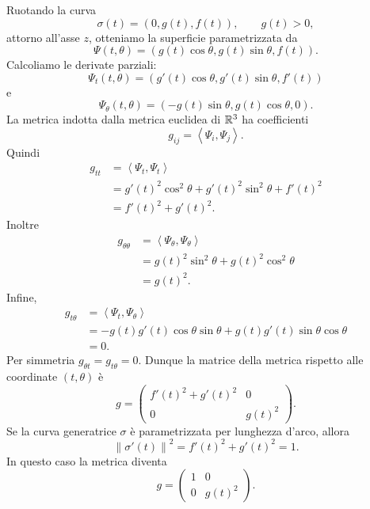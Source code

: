 \documentclass[a4paper]{article}
\begin{document}
\begin{snippetsolution}{}
    Ruotando la curva
    \[
        \sigma(t)=\left(0,g(t),f(t)\right),
        \qquad g(t)>0,
    \]
    attorno all'asse \(z\), otteniamo la superficie parametrizzata da
    \[
        \Psi(t,\theta)
        =
        \left(
            g(t)\cos\theta,
            g(t)\sin\theta,
            f(t)
        \right).
    \]
    Calcoliamo le derivate parziali:
    \[
        \Psi_t(t,\theta)
        =
        \left(
            g'(t)\cos\theta,
            g'(t)\sin\theta,
            f'(t)
        \right)
    \]
    e
    \[
        \Psi_\theta(t,\theta)
        =
        \left(
            -g(t)\sin\theta,
            g(t)\cos\theta,
            0
        \right).
    \]
    La metrica indotta dalla metrica euclidea di \(\mathbb{R}^3\) ha coefficienti
    \[
        g_{ij}=\left\langle \Psi_i,\Psi_j\right\rangle.
    \]
    Quindi
    \begin{align*}
        g_{tt}
        &=
        \left\langle \Psi_t,\Psi_t\right\rangle\\
        &=
        g'(t)^2\cos^2\theta+g'(t)^2\sin^2\theta+f'(t)^2\\
        &=
        f'(t)^2+g'(t)^2.
    \end{align*}
    Inoltre
    \begin{align*}
        g_{\theta\theta}
        &=
        \left\langle \Psi_\theta,\Psi_\theta\right\rangle\\
        &=
        g(t)^2\sin^2\theta+g(t)^2\cos^2\theta\\
        &=
        g(t)^2.
    \end{align*}
    Infine,
    \begin{align*}
        g_{t\theta}
        &=
        \left\langle \Psi_t,\Psi_\theta\right\rangle\\
        &=
        -g(t)g'(t)\cos\theta\sin\theta
        +
        g(t)g'(t)\sin\theta\cos\theta\\
        &=
        0.
    \end{align*}
    Per simmetria \(g_{\theta t}=g_{t\theta}=0\). Dunque la matrice della metrica rispetto alle coordinate \((t,\theta)\) è
    \[
        g
        =
        \begin{pmatrix}
            f'(t)^2+g'(t)^2 & 0\\
            0 & g(t)^2
        \end{pmatrix}.
    \]
    Se la curva generatrice \(\sigma\) è parametrizzata per lunghezza d'arco, allora
    \[
        \left\|\sigma'(t)\right\|^2=f'(t)^2+g'(t)^2=1.
    \]
    In questo caso la metrica diventa
    \[
        g
        =
        \begin{pmatrix}
            1 & 0\\
            0 & g(t)^2
        \end{pmatrix}.
    \]
\end{snippetsolution}
\end{document}
